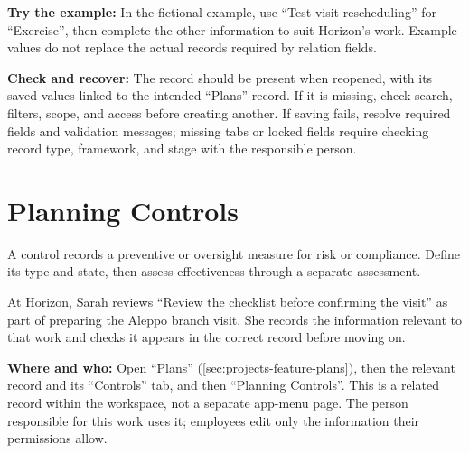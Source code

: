 \textbf{Try the example:} In the fictional example, use “Test visit rescheduling” for “Exercise”, then complete the other information to suit Horizon's work. Example values do not replace the actual records required by relation fields.

\textbf{Check and recover:} The record should be present when reopened, with its saved values linked to the intended “Plans” record. If it is missing, check search, filters, scope, and access before creating another. If saving fails, resolve required fields and validation messages; missing tabs or locked fields require checking record type, framework, and stage with the responsible person.

\clearpage
\section{Planning Controls}
\label{sec:projects-feature-planning-controls}

A control records a preventive or oversight measure for risk or compliance. Define its type and state, then assess effectiveness through a separate assessment.

\begin{rcnote}
At Horizon, Sarah reviews “Review the checklist before confirming the visit” as part of preparing the Aleppo branch visit. She records the information relevant to that work and checks it appears in the correct record before moving on.
\end{rcnote}

\textbf{Where and who:} Open “Plans” (\ref{sec:projects-feature-plans}), then the relevant record and its “Controls” tab, and then “Planning Controls”. This is a related record within the workspace, not a separate app-menu page. The person responsible for this work uses it; employees edit only the information their permissions allow.

